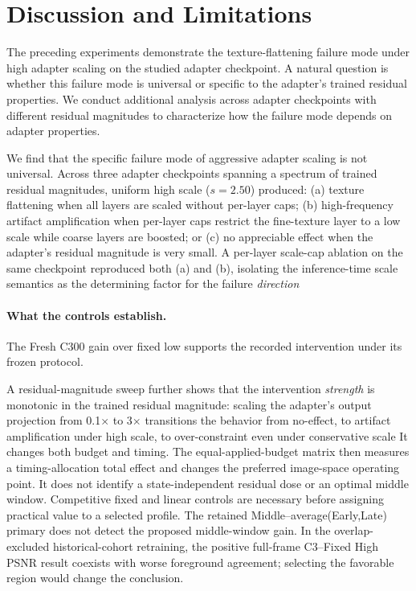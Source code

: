 \documentclass[times,twocolumn,final]{elsarticle}
\providecommand{\DIFadd}[1]{{\protect\color{blue} \sf #1}} %
\providecommand{\DIFdel}[1]{{\protect\color{red} \scriptsize #1}} %
\providecommand{\DIFaddbegin}{} %
\providecommand{\DIFaddend}{} %
\providecommand{\DIFdelbegin}{} %
\providecommand{\DIFdelend}{} %
\begin{document}
\FloatBarrier
\DIFaddbegin \section{Discussion and Limitations}
\label{sec:limitations}
\DIFaddend 

\DIFdelbegin %

\DIFdel{The preceding experiments demonstrate the texture-flattening failure mode under high adapter scaling on the studied adapter checkpoint. A natural question is whether this failure mode is universal or specific to the adapter's trained residual properties. We conduct additional analysis across adapter checkpoints with different residual magnitudes to characterize how the failure mode depends on adapter properties. }%

\DIFdel{We find that the specific failure mode of aggressive adapter scaling is not universal. Across three adapter checkpoints spanning a spectrum of trained residual magnitudes, uniform high scale ($s = 2.50$) produced: (a) texture flattening when all layers are scaled without per-layer caps; (b) high-frequency artifact amplification when per-layer caps restrict the fine-texture layer to a low scale while coarse layers are boosted; or (c) no appreciable effect when the adapter's residual magnitude is very small. A per-layer scale-cap ablation on the same checkpoint reproduced both (a) and (b), isolating the inference-time scale semantics as the determining factor for the failure \emph{direction}}\DIFdelend \DIFaddbegin \paragraph{What the controls establish.}
\DIFadd{The Fresh C300 gain over fixed low supports the recorded intervention under its frozen protocol}\DIFaddend . \DIFdelbegin %

\DIFdel{A residual-magnitude sweep further shows that the intervention \emph{strength} is monotonic in the trained residual magnitude: scaling the adapter's output projection from 0.1$\times$ to 3$\times$ transitions the behavior from no-effect, to artifact amplification under high scale, to over-constraint even under conservative scale}\DIFdelend \DIFaddbegin \DIFadd{It changes both budget and timing. The equal-applied-budget matrix then measures a timing-allocation total effect and changes the preferred image-space operating point. It does not identify a state-independent residual dose or an optimal middle window. Competitive fixed and linear controls are necessary before assigning practical value to a selected profile. The retained Middle--average(Early,Late) primary does not detect the proposed middle-window gain. In the overlap-excluded historical-cohort retraining, the positive full-frame C3--Fixed High PSNR result coexists with worse foreground agreement; selecting the favorable region would change the conclusion}\DIFaddend .
\end{document}
